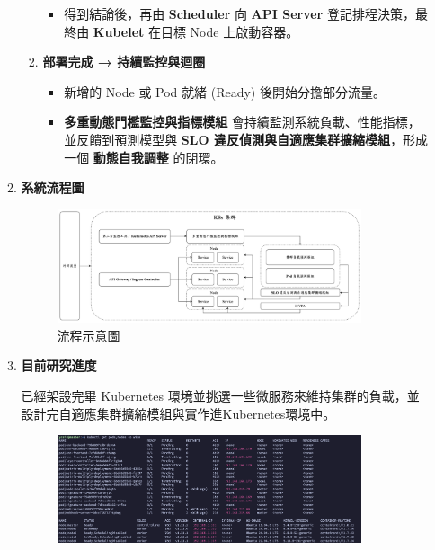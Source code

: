 \documentclass[12pt,a4paper]{article}
\begin{document}
\begin{enumerate}[label={(\zhdig*)}, leftmargin=2\parindent, listparindent=\parindent]
\begin{enumerate}[label={(\arabic*)}, leftmargin=\parindent, listparindent=\parindent]
\begin{enumerate}[label={(\zhdig*)}, leftmargin=\parindent, listparindent=\parindent]
\begin{itemize}[leftmargin=\parindent, listparindent=\parindent]
        \item 得到結論後，再由 \textbf{Scheduler} 向 \textbf{API Server} 登記排程決策，最終由 \textbf{Kubelet} 在目標 Node 上啟動容器。
    \end{itemize}
\item \textbf{部署完成 → 持續監控與迴圈}\textbf{}
    \begin{itemize}[leftmargin=\parindent, listparindent=\parindent]

        \item 新增的 Node 或 Pod 就緒 (Ready) 後開始分擔部分流量。

        \item \textbf{多重動態門檻監控與指標模組} 會持續監測系統負載、性能指標，並反饋到預測模型與 \textbf{SLO 違反偵測與自適應集群擴縮模組}，形成一個 \textbf{動態自我調整} 的閉環。
\end{itemize}
    \end{enumerate}

\item \textbf{
    系統流程圖}
\begin{figure} [htbp]

    \centering

\includegraphics[width=0.9\textwidth]{../figure/flowchart.png}

    \caption{流程示意圖}

\end{figure}\newpage

\item \textbf{
    目前研究進度}

    已經架設完畢 Kubernetes 環境並挑選一些微服務來維持集群的負載，並設計完自適應集群擴縮模組與實作進Kubernetes環境中。

\begin{figure} [htbp]

    \centering

    \includegraphics[width=0.9\textwidth]{../figure/k8s.png}


\end{figure}
\end{enumerate}
\end{enumerate}
\end{document}
